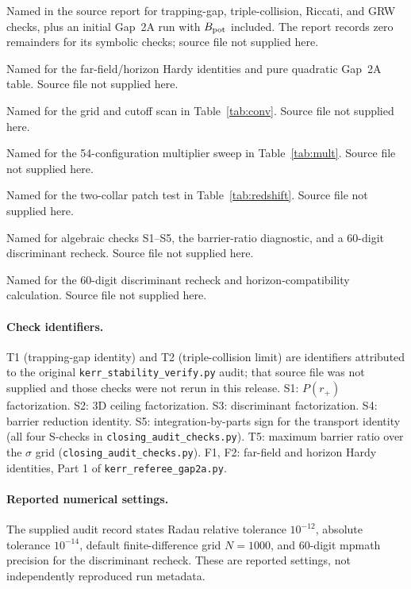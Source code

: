 \documentclass[11pt,a4paper]{article}
\theoremstyle{remark}
\theoremstyle{definition}
\begin{document}
\begin{description}[leftmargin=3.2cm, style=nextline]
\item[\texttt{kerr\_stability\_verify.py}] Named in the source report for trapping-gap, triple-collision, Riccati, and GRW checks, plus an initial Gap~2A run with $B_{\rm pot}$ included. The report records zero remainders for its symbolic checks; source file not supplied here.
\item[\texttt{kerr\_referee\_gap2a.py}] Named for the far-field/horizon Hardy identities and pure quadratic Gap~2A table. Source file not supplied here.
\item[\texttt{kerr\_convergence\_sweep.py}] Named for the grid and cutoff scan in Table~\ref{tab:conv}. Source file not supplied here.
\item[\texttt{kerr\_multiplier\_sweep.py}] Named for the 54-configuration multiplier sweep in Table~\ref{tab:mult}. Source file not supplied here.
\item[\texttt{kerr\_redshift\_patch.py}] Named for the two-collar patch test in Table~\ref{tab:redshift}. Source file not supplied here.
\item[\texttt{closing\_audit\_checks.py}] Named for algebraic checks S1--S5, the barrier-ratio diagnostic, and a 60-digit discriminant recheck. Source file not supplied here.
\item[\texttt{extra\_checks.py}] Named for the 60-digit discriminant recheck and horizon-compatibility calculation. Source file not supplied here.
\end{description}

\paragraph{Check identifiers.} T1 (trapping-gap identity) and T2 (triple-collision limit) are identifiers attributed to the original \texttt{kerr\_stability\_verify.py} audit; that source file was not supplied and those checks were not rerun in this release. S1: $P(r_+)$ factorization. S2: 3D ceiling factorization. S3: discriminant factorization. S4: barrier reduction identity. S5: integration-by-parts sign for the transport identity (all four S-checks in \texttt{closing\_audit\_checks.py}). T5: maximum barrier ratio over the $\sigma$ grid (\texttt{closing\_audit\_checks.py}). F1, F2: far-field and horizon Hardy identities, Part 1 of \texttt{kerr\_referee\_gap2a.py}.

\paragraph{Reported numerical settings.} The supplied audit record states Radau relative tolerance $10^{-12}$, absolute tolerance $10^{-14}$, default finite-difference grid $N=1000$, and 60-digit mpmath precision for the discriminant recheck. These are reported settings, not independently reproduced run metadata.
\end{document}
